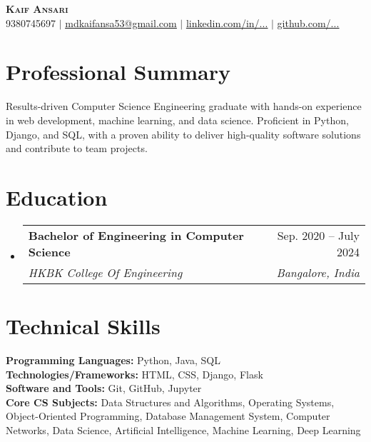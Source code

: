 \documentclass[letterpaper,11pt]{article}
\makeatletter
\newcommand{\resumeSubheading}[4]{
  \vspace{-2pt}\item
    \begin{tabular*}{0.97\textwidth}[t]{l@{\extracolsep{\fill}}r}
      \textbf{#1} & #2 \\
      \textit{\small#3} & \textit{\small #4} \\
    \end{tabular*}\vspace{-7pt}
}
\newcommand{\resumeSubHeadingListStart}{\begin{itemize}[leftmargin=0.15in, label={}]}
\newcommand{\resumeSubHeadingListEnd}{\end{itemize}}
\makeatother
\begin{document}
\begin{center}
    \textbf{\Huge \scshape Kaif Ansari} \\ \vspace{1pt}
    \small 9380745697 $|$ \href{mailto:mdkaifansa53@gmail.com}{\underline{mdkaifansa53@gmail.com}} $|$ 
    \href{https://linkedin.com/in/...}{\underline{linkedin.com/in/...}} $|$
    \href{https://github.com/...}{\underline{github.com/...}}
\end{center}

\section{Professional Summary}
\small{Results-driven Computer Science Engineering graduate with hands-on experience in web development, machine learning, and data science. Proficient in Python, Django, and SQL, with a proven ability to deliver high-quality software solutions and contribute to team projects.}

\section{Education}
\resumeSubHeadingListStart
  \resumeSubheading
    {Bachelor of Engineering in Computer Science}{Sep. 2020 -- July 2024}
    {HKBK College Of Engineering}{Bangalore, India}
\resumeSubHeadingListEnd

\section{Technical Skills}
\begin{itemize}[leftmargin=0.15in, label={}]
  \small{\item{
   \textbf{Programming Languages:} Python, Java, SQL \\
   \textbf{Technologies/Frameworks:} HTML, CSS, Django, Flask \\
   \textbf{Software and Tools:} Git, GitHub, Jupyter \\
   \textbf{Core CS Subjects:} Data Structures and Algorithms, Operating Systems, Object-Oriented Programming, Database Management System, Computer Networks, Data Science, Artificial Intelligence, Machine Learning, Deep Learning
  }}
\end{itemize}
\end{document}
